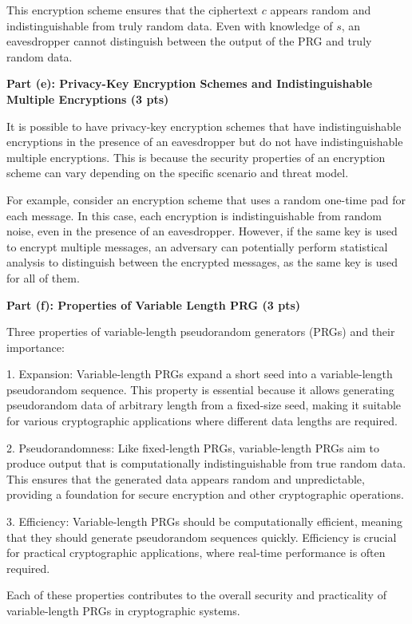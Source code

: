 \documentclass{article}
\begin{document}
This encryption scheme ensures that the ciphertext $c$ appears random and indistinguishable from truly random data. Even with knowledge of $s$, an eavesdropper cannot distinguish between the output of the PRG and truly random data.

\textbf{Part (e): Privacy-Key Encryption Schemes and Indistinguishable Multiple Encryptions (3 pts)}

It is possible to have privacy-key encryption schemes that have indistinguishable encryptions in the presence of an eavesdropper but do not have indistinguishable multiple encryptions. This is because the security properties of an encryption scheme can vary depending on the specific scenario and threat model.

For example, consider an encryption scheme that uses a random one-time pad for each message. In this case, each encryption is indistinguishable from random noise, even in the presence of an eavesdropper. However, if the same key is used to encrypt multiple messages, an adversary can potentially perform statistical analysis to distinguish between the encrypted messages, as the same key is used for all of them.

\textbf{Part (f): Properties of Variable Length PRG (3 pts)}

Three properties of variable-length pseudorandom generators (PRGs) and their importance:

1. Expansion: Variable-length PRGs expand a short seed into a variable-length pseudorandom sequence. This property is essential because it allows generating pseudorandom data of arbitrary length from a fixed-size seed, making it suitable for various cryptographic applications where different data lengths are required.

2. Pseudorandomness: Like fixed-length PRGs, variable-length PRGs aim to produce output that is computationally indistinguishable from true random data. This ensures that the generated data appears random and unpredictable, providing a foundation for secure encryption and other cryptographic operations.

3. Efficiency: Variable-length PRGs should be computationally efficient, meaning that they should generate pseudorandom sequences quickly. Efficiency is crucial for practical cryptographic applications, where real-time performance is often required.

Each of these properties contributes to the overall security and practicality of variable-length PRGs in cryptographic systems.
\end{document}
